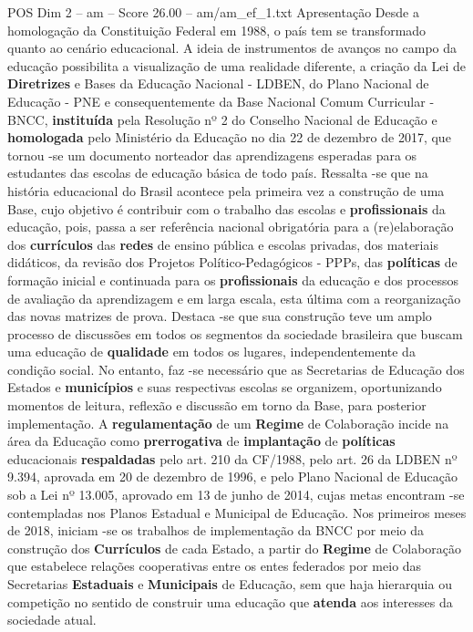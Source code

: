 \begin{textsample}{POS Dim 2 – am – Score 26.00 – am/am\_ef\_1.txt}  \label{ex:f2_pos_152}
Apresentação Desde a homologação da Constituição Federal em 1988, o país tem se transformado quanto ao cenário educacional.
A ideia de instrumentos de avanços no campo da educação possibilita a visualização de uma realidade diferente, a criação da Lei de \textbf{Diretrizes} e Bases da Educação Nacional - LDBEN, do Plano Nacional de Educação - PNE e consequentemente da Base Nacional Comum Curricular - BNCC, \textbf{instituída} pela Resolução nº 2 do Conselho Nacional de Educação e \textbf{homologada} pelo Ministério da Educação no dia 22 de dezembro de 2017, que tornou -se um documento norteador das aprendizagens esperadas para os estudantes das escolas de educação básica de todo país.
Ressalta -se que na história educacional do Brasil acontece pela primeira vez a construção de uma Base, cujo objetivo é contribuir com o trabalho das escolas e \textbf{profissionais} da educação, pois, passa a ser referência nacional obrigatória para a (re)elaboração dos \textbf{currículos} das \textbf{redes} de ensino pública e escolas privadas, dos materiais didáticos, da revisão dos Projetos Político-Pedagógicos - PPPs, das \textbf{políticas} de formação inicial e continuada para os \textbf{profissionais} da educação e dos processos de avaliação da aprendizagem e em larga escala, esta última com a reorganização das novas matrizes de prova.
Destaca -se que sua construção teve um amplo processo de discussões em todos os segmentos da sociedade brasileira que buscam uma educação de \textbf{qualidade} em todos os lugares, independentemente da condição social.
No entanto, faz -se necessário que as Secretarias de Educação dos Estados e \textbf{municípios} e suas respectivas escolas se organizem, oportunizando momentos de leitura, reflexão e discussão em torno da Base, para posterior implementação.
A \textbf{regulamentação} de um \textbf{Regime} de Colaboração incide na área da Educação como \textbf{prerrogativa} de \textbf{implantação} de \textbf{políticas} educacionais \textbf{respaldadas} pelo art. 210 da CF/1988, pelo art. 26 da LDBEN nº 9.394, aprovada em 20 de dezembro de 1996, e pelo Plano Nacional de Educação sob a Lei nº 13.005, aprovado em 13 de junho de 2014, cujas metas encontram -se contempladas nos Planos Estadual e Municipal de Educação.
Nos primeiros meses de 2018, iniciam -se os trabalhos de implementação da BNCC por meio da construção dos \textbf{Currículos} de cada Estado, a partir do \textbf{Regime} de Colaboração que estabelece relações cooperativas entre os entes federados por meio das Secretarias \textbf{Estaduais} e \textbf{Municipais} de Educação, sem que haja hierarquia ou competição no sentido de construir uma educação que \textbf{atenda} aos interesses da sociedade atual.

\end{textsample}
